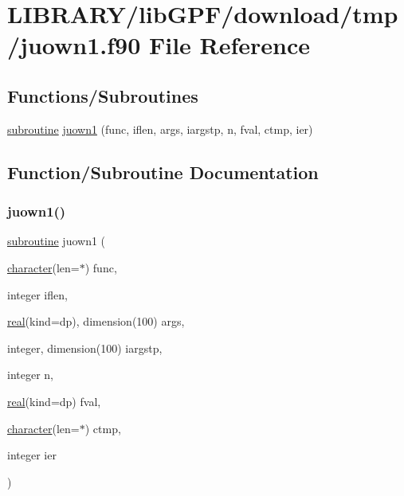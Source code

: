 \hypertarget{juown1_8f90}{}\section{L\+I\+B\+R\+A\+R\+Y/lib\+G\+P\+F/download/tmp/juown1.f90 File Reference}
\label{juown1_8f90}
\subsection*{Functions/\+Subroutines}
\begin{DoxyCompactItemize}
\item 
\hyperlink{M__stopwatch_83_8txt_acfbcff50169d691ff02d4a123ed70482}{subroutine} \hyperlink{juown1_8f90_a313c897cec3139ac9722b8f907c86495}{juown1} (func, iflen, args, iargstp, n, fval, ctmp, ier)
\end{DoxyCompactItemize}


\subsection{Function/\+Subroutine Documentation}
\mbox{\label{juown1_8f90_a313c897cec3139ac9722b8f907c86495}} 
\subsubsection{\texorpdfstring{juown1()}{juown1()}}
{\footnotesize\ttfamily \hyperlink{M__stopwatch_83_8txt_acfbcff50169d691ff02d4a123ed70482}{subroutine} juown1 (\begin{DoxyParamCaption}\item[{\hyperlink{option__stopwatch_83_8txt_abd4b21fbbd175834027b5224bfe97e66}{character}(len=$\ast$)}]{func,  }\item[{integer}]{iflen,  }\item[{\hyperlink{read__watch_83_8txt_abdb62bde002f38ef75f810d3a905a823}{real}(kind=dp), dimension(100)}]{args,  }\item[{integer, dimension(100)}]{iargstp,  }\item[{integer}]{n,  }\item[{\hyperlink{read__watch_83_8txt_abdb62bde002f38ef75f810d3a905a823}{real}(kind=dp)}]{fval,  }\item[{\hyperlink{option__stopwatch_83_8txt_abd4b21fbbd175834027b5224bfe97e66}{character}(len=$\ast$)}]{ctmp,  }\item[{integer}]{ier }\end{DoxyParamCaption})}



